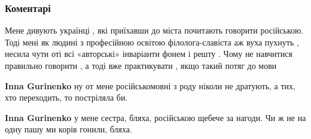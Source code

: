  
 
 
 
 
\subsubsection{Коментарі}
\label{sec:25_07_2021.fb.miroslava_iltjo.1.mova_zakon_jazyk_rodnoj.cmt}

\begin{itemize}
 

Мене дивують українці , які приїхавши до міста почитають говорити російською.
Тоді мені як людині з професійною освітою філолога-славіста аж вуха пухнуть ,
несила чути оті всі «авторські» інваріанти фонем і решту . Чому не навчитися
правильно говорити , а тоді вже практикувати , якщо такий потяг до мови

\begin{itemize}
 
\textbf{Inna Gurinenko} ну от мене російськомовні з роду ніколи не дратують, а тих, хто переходить, то постріляла би.

 
\textbf{Inna Gurinenko} у мене сестра, бляха, російською щебече за нагоди. Чи ж
не на одну пашу ми корів гонили, бляха.

 

\end{itemize}
\end{itemize}
